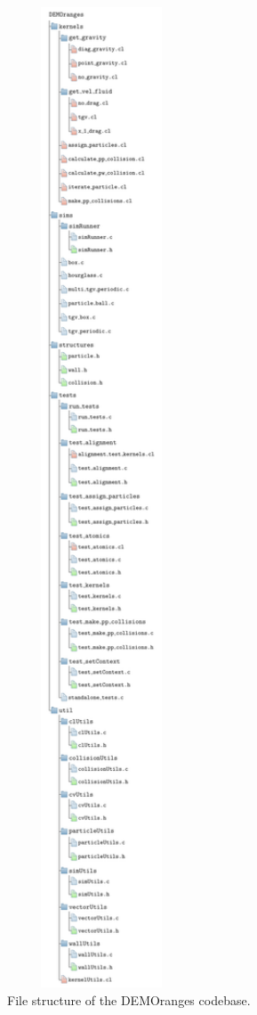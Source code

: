 \documentclass[../Interim_Report_Master]{subfiles}
\begin{document}
\begin{figure}
	\centering
	\includegraphics*[width=0.5\textwidth, trim=0 0 0 1050, clip]{./Diagrams/DEMOranges_Structure/DEMOranges_Structure.pdf}
	\caption{File structure of the DEMOranges codebase.}
	\label{demorange_struct}
\end{figure}
\end{document}
